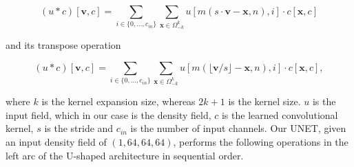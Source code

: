 \documentclass{article}
\begin{document}
\begin{equation}
    (u \ast c)[\mathbf{v}, c] = \sum_{i \in \{0, \dots, c_{in}\}} \sum_{\mathbf{x} \in \Omega_{-k}^{k}} u\left[m(s \cdot \mathbf{v} - \mathbf{x}, n), i\right] \cdot c[\mathbf{x}, c]
\end{equation}

and its transpose operation

\begin{equation}
    (u \ast c)[\mathbf{v}, c] = \sum_{i \in \{0, \dots, c_{in}\}} \sum_{\mathbf{x} \in \Omega_{-k}^{k}} u\left[m(\lfloor \mathbf{v} / s \rfloor - \mathbf{x}, n), i\right] \cdot c[\mathbf{x}, c],
\end{equation}

where $k$ is the kernel expansion size, whereas $2k + 1$ is the kernel size. $u$ is the input field, which in our case is the density field, $c$ is the learned convolutional kernel, $s$ is the stride and $c_{in}$ is the number of input channels. Our UNET, given an input density field of $(1, 64, 64, 64)$, performs the following operations in the left arc of the U-shaped architecture in sequential order.
\end{document}
